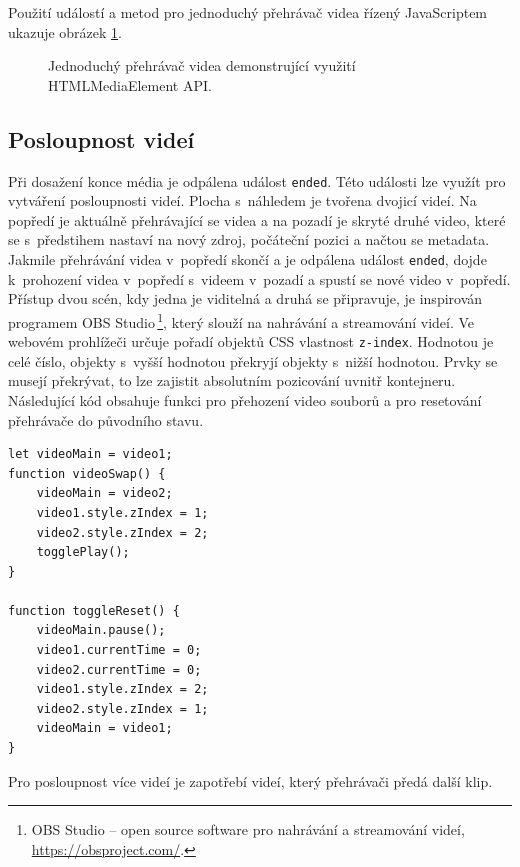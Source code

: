 Použití událostí a metod pro jednoduchý přehrávač videa řízený JavaScriptem ukazuje obrázek \ref{img:html-control}.

\begin{figure}[h]
	\centering
	\caption{Jednoduchý přehrávač videa demonstrující využití HTMLMediaElement API.}\label{img:html-control}
\end{figure}

\subsection{Posloupnost videí}
Při dosažení konce média je odpálena událost \texttt{ended}. Této události lze využít pro vytváření posloupnosti videí. Plocha s~náhledem je tvořena dvojicí videí. Na popředí je aktuálně přehrávající se videa a na pozadí je skryté druhé video, které se s~předstihem nastaví na nový zdroj, počáteční pozici a načtou se metadata. Jakmile přehrávání videa v~popředí skončí a je odpálena událost \texttt{ended}, dojde k~prohození videa v~popředí s~videem v~pozadí a spustí se nové video v~popředí. Přístup dvou scén, kdy jedna je viditelná a druhá se připravuje, je inspirován programem OBS Studio\,\footnote{OBS Studio -- open source software pro nahrávání a streamování videí, \url{https://obsproject.com/}.}, který slouží na nahrávání a streamování videí. Ve webovém prohlížeči určuje pořadí objektů CSS vlastnost \texttt{z-index}. Hodnotou je celé číslo, objekty s~vyšší hodnotou překryjí objekty s~nižší hodnotou. Prvky se musejí překrývat, to lze zajistit absolutním pozicování uvnitř kontejneru. Následující kód obsahuje funkci pro přehození video souborů a pro resetování přehrávače do původního stavu.
\begin{lstlisting}[style=JavaScript]
let videoMain = video1;
function videoSwap() {
    videoMain = video2;
    video1.style.zIndex = 1;
    video2.style.zIndex = 2;
    togglePlay();
}

function toggleReset() {
    videoMain.pause();
    video1.currentTime = 0;
    video2.currentTime = 0;
    video1.style.zIndex = 2;
    video2.style.zIndex = 1;
    videoMain = video1;
}
\end{lstlisting}
Pro posloupnost více videí je zapotřebí  videí, který přehrávači předá další klip.

